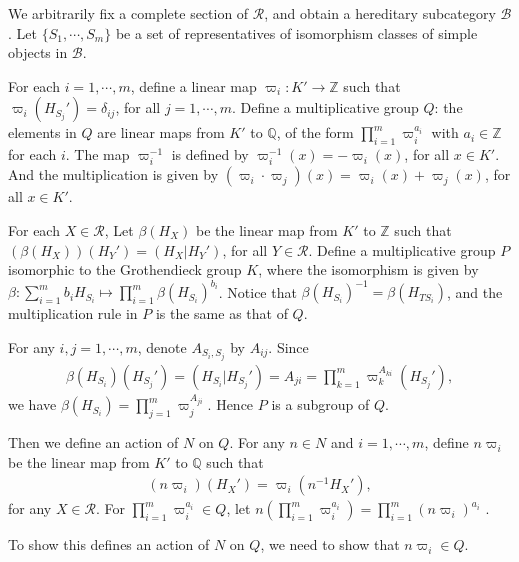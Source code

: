 \documentclass[12pt]{amsart}
\begin{document}
We arbitrarily fix a complete section of $\mathcal{R}$, and obtain a hereditary subcategory $\mathcal{B}$.
Let $\{ S_1, \cdots ,S_m \}$ be a set of representatives of isomorphism classes of simple objects in $\mathcal{B}$.

For each $i = 1,\cdots,m$, define a linear map $\varpi_i : K' \rightarrow \mathbb{Z} $ such that $\varpi_i(H_{S_j}') = \delta_{ij}$, for all $j=1,\cdots,m$.
Define a multiplicative group $Q$: 
the elements in $Q$ are linear maps from $K'$ to $\mathbb{Q}$, of the form $\prod_{i=1}^m \varpi_i^{a_i}$ with $a_i\in \mathbb{Z}$ for each $i$.
The map $\varpi_i^{-1}$ is defined by $\varpi_i^{-1}(x) = -\varpi_i(x)$, for all $x\in K'$. 
And the multiplication is given by $(\varpi_i \cdot \varpi_j)(x) = \varpi_i(x)+\varpi_j(x)$, for all $x\in K'$.

For each $X\in \mathcal{R}$, Let $\beta(H_X)$ be the linear map from $K'$ to $\mathbb{Z}$ such that $(\beta(H_X))(H_Y') = (H_X|H_Y')$, for all $Y\in \mathcal{R}$.
Define a multiplicative group $P$ isomorphic to the Grothendieck group $K$, 
where the isomorphism is given by $\beta: \sum_{i=1}^m b_iH_{S_i} \mapsto \prod_{i=1}^m \beta(H_{S_i})^{b_i}$.
Notice that $\beta(H_{S_i})^{-1} = \beta(H_{TS_i})$, and the multiplication rule in $P$ is the same as that of $Q$. 

For any $i,j=1,\cdots,m$, denote $A_{S_i,S_j}$ by $A_{ij} $.
Since 
\begin{align*}
    \beta(H_{S_i})(H_{S_j}') = (H_{S_i}|H_{S_j}') = A_{ji} = \prod_{k=1}^m \varpi_k^{A_{ki}}(H_{S_j}'),
\end{align*}
we have $\beta(H_{S_i}) = \prod_{j=1}^m \varpi_j^{A_{ji}}$.
Hence $P$ is a subgroup of $Q$.

Then we define an action of $N$ on $Q$.
For any $n\in N$ and $i=1,\cdots ,m$, define $n\varpi_i$ be the linear map from $K'$ to $\mathbb{Q}$ such that 
\begin{align*}
    (n\varpi_i)(H_X') = \varpi_i (n^{-1}H_X'), 
\end{align*}
for any $X\in \mathcal{R}$.
For $\prod_{i=1}^m \varpi_i^{a_i}\in Q$, let $n(\prod_{i=1}^m \varpi_i^{a_i}) = \prod_{i=1}^m (n\varpi_i)^{a_i} $ .

To show this defines an action of $N$ on $Q$, we need to show that $n\varpi_i \in Q$.
\end{document}

